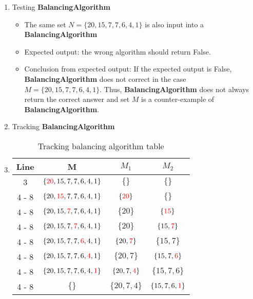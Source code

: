\documentclass{article}
\begin{document}
	\begin{enumerate}
		\item Testing \textbf{BalancingAlgorithm}
		\begin{itemize}
			\item The same set \(N = \{20, 15, 7, 7, 6, 4, 1\}\) is also input into a \textbf{BalancingAlgorithm}
			\item Expected output: the wrong algorithm should return False.
			\item Conclusion from expected output: If the expected output is False, \textbf{BalancingAlgorithm} does not correct in the case \(M = \{20, 15, 7, 7, 6, 4, 1\}\). Thus, \textbf{BalancingAlgorithm} does not always return the correct answer and set \(M\) is a counter-example of \textbf{BalancingAlgorithm}.
		\end{itemize}
		\item Tracking \textbf{BalancingAlgorithm}
		\item \begin{table}[ht]
			\centering
			\caption{Tracking balancing algorithm table}
			\label{balancing table}
			\begin{tabular}{|c|c|c|c|}
			\hline
			\rowcolor[HTML]{EFEFEF} 
			Line & \textbf{M} & \textbf{\(M_1\)} & \textbf{\(M_2\)} \\ \hline
			3 & \( \{\textcolor{red}{20}, 15, 7, 7, 6, 4, 1\} \) & \( \{\} \) & \( \{\} \) \\ \hline
			4 - 8 & \(\{20, \textcolor{red}{15}, 7, 7, 6, 4, 1\}\) & \(\{\textcolor{red}{20}\}\) & \(\{\}\)\\ \hline
			4 - 8 & \(\{20, 15, \textcolor{red}{7}, 7, 6, 4, 1\}\) & \(\{20\}\) & \(\{\textcolor{red}{15}\}\)\\ \hline
			4 - 8 & \(\{20, 15, 7, \textcolor{red}{7}, 6, 4, 1\}\) & \(\{20\}\) & \(\{15, \textcolor{red}{7}\}\)\\ \hline
			4 - 8 & \(\{20, 15, 7, 7, \textcolor{red}{6}, 4, 1\}\) & \(\{20, \textcolor{red}{7}\}\) & \(\{15, 7\}\)\\ \hline
			4 - 8 & \(\{20, 15, 7, 7, 6, \textcolor{red}{4}, 1\}\) & \(\{20, 7\}\) & \(\{15, 7, \textcolor{red}{6}\}\)\\ \hline
			4 - 8 & \(\{20, 15, 7, 7, 6, 4, \textcolor{red}{1}\}\) & \(\{20, 7, \textcolor{red}{4}\}\) & \(\{15, 7, 6\}\)\\ \hline
			4 - 8& \(\{\}\) & \(\{20, 7, 4\}\) & \(\{15, 7, 6, \textcolor{red}{1}\}\)\\ \hline
		\end{tabular}
		\end{table}

\end{enumerate}
\end{document}
